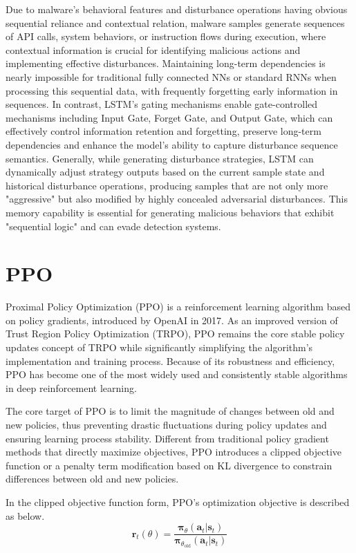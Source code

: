 Due to malware's behavioral features and disturbance operations having obvious sequential reliance and contextual relation, malware samples generate sequences of API calls, system behaviors, or instruction flows during execution, where contextual information is crucial for identifying malicious actions and implementing effective disturbances. Maintaining long-term dependencies is nearly impossible for traditional fully connected NNs or standard RNNs when processing this sequential data, with frequently forgetting early information in sequences. In contrast, LSTM's gating mechanisms enable gate-controlled mechanisms including Input Gate, Forget Gate, and Output Gate, which can effectively control information retention and forgetting, preserve long-term dependencies and enhance the model's ability to capture disturbance sequence semantics. Generally, while generating disturbance strategies, LSTM can dynamically adjust strategy outputs based on the current sample state and historical disturbance operations, producing samples that are not only more "aggressive" but also modified by highly concealed adversarial disturbances. This memory capability is essential for generating malicious behaviors that exhibit "sequential logic" and can evade detection systems.

\section{PPO}

Proximal Policy Optimization (PPO) is a reinforcement learning algorithm based on policy gradients\cite{yu2022surprising}, introduced by OpenAI in 2017. As an improved version of Trust Region Policy Optimization (TRPO), PPO remains the core stable policy updates concept of TRPO while significantly simplifying the algorithm's implementation and training process. Because of its robustness and efficiency, PPO has become one of the most widely used and consistently stable algorithms in deep reinforcement learning.

The core target of PPO is to limit the magnitude of changes between old and new policies, thus preventing drastic fluctuations during policy updates and ensuring learning process stability. Different from traditional policy gradient methods that directly maximize objectives, PPO introduces a clipped objective function or a penalty term modification based on KL divergence to constrain differences between old and new policies.

In the clipped objective function form, PPO's optimization objective is described as below.
\begin{equation}
	\boldsymbol{r}_t(\theta) = \frac{\boldsymbol{\pi}_\theta(\boldsymbol{a}_t | \boldsymbol{s}_t)}{\boldsymbol{\pi}_{\theta_{\text{old}}}(\boldsymbol{a}_t | \boldsymbol{s}_t)}
\end{equation}

